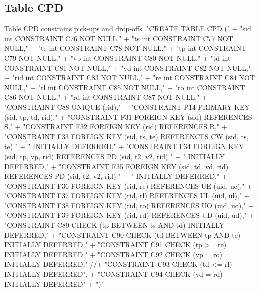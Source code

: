 \subsection{Table CPD}
Table CPD constrains pick-ups and drop-offs.
\nwenddocs{}\endmoddef{}
"CREATE TABLE CPD ("
  + "sid int  CONSTRAINT C76 NOT NULL,"
  + "ts  int  CONSTRAINT C77 NOT NULL,"
  + "te  int  CONSTRAINT C78 NOT NULL,"
  + "tp  int  CONSTRAINT C79 NOT NULL,"
  + "vp  int  CONSTRAINT C80 NOT NULL,"
  + "td  int  CONSTRAINT C81 NOT NULL,"
  + "vd  int  CONSTRAINT C82 NOT NULL,"
  + "rid int  CONSTRAINT C83 NOT NULL,"
  + "re  int  CONSTRAINT C84 NOT NULL,"
  + "rl  int  CONSTRAINT C85 NOT NULL,"
  + "ro  int  CONSTRAINT C86 NOT NULL,"
  + "rd  int  CONSTRAINT C87 NOT NULL,"
  + "CONSTRAINT C88 UNIQUE (rid),"
  + "CONSTRAINT P14 PRIMARY KEY (sid, tp, td, rid),"
  + "CONSTRAINT F31 FOREIGN KEY (sid) REFERENCES S,"
  + "CONSTRAINT F32 FOREIGN KEY (rid) REFERENCES R,"
  + "CONSTRAINT F33 FOREIGN KEY (sid, ts, te) REFERENCES CW (sid, ts, te) "
  + "  INITIALLY DEFERRED,"
  + "CONSTRAINT F34 FOREIGN KEY (sid, tp, vp, rid) REFERENCES PD (sid, t2, v2, rid) "
  + "  INITIALLY DEFERRED,"
  + "CONSTRAINT F35 FOREIGN KEY (sid, td, vd, rid) REFERENCES PD (sid, t2, v2, rid) "
  + "  INITIALLY DEFERRED,"
  + "CONSTRAINT F36 FOREIGN KEY (rid, re) REFERENCES UE (uid, ue),"
  + "CONSTRAINT F37 FOREIGN KEY (rid, rl) REFERENCES UL (uid, ul),"
  + "CONSTRAINT F38 FOREIGN KEY (rid, ro) REFERENCES UO (uid, uo),"
  + "CONSTRAINT F39 FOREIGN KEY (rid, rd) REFERENCES UD (uid, ud),"
  + "CONSTRAINT C89 CHECK (tp BETWEEN ts AND td) INITIALLY DEFERRED,"
  + "CONSTRAINT C90 CHECK (td BETWEEN tp AND te) INITIALLY DEFERRED,"
  + "CONSTRAINT C91 CHECK (tp >= re) INITIALLY DEFERRED,"
  + "CONSTRAINT C92 CHECK (vp  = ro) INITIALLY DEFERRED,"
//+ "CONSTRAINT C93 CHECK (td <= rl) INITIALLY DEFERRED",
  + "CONSTRAINT C94 CHECK (vd  = rd) INITIALLY DEFERRED"
  + ")"
\nwendcode{}\nwdocspar

